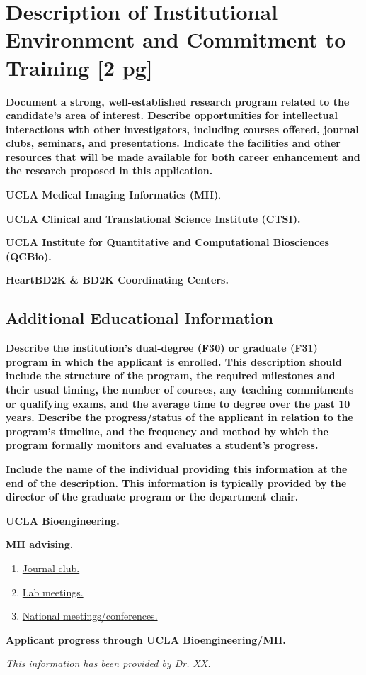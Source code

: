\documentclass[11pt]{article}
\begin{document}
\section*{Description of Institutional Environment and Commitment to Training [2 pg]}

\textbf{Document a strong, well-established research program related to the candidate's area of
interest. Describe opportunities for intellectual interactions with other investigators, including
courses offered, journal clubs, seminars, and presentations. Indicate the facilities and other
resources that will be made available for both career enhancement and the research proposed in
this application.}

\textbf{UCLA Medical Imaging Informatics (MII)}. 
\lipsum[20-22]

\textbf{UCLA Clinical and Translational Science Institute (CTSI).} 
\lipsum[30]

\textbf{UCLA Institute for Quantitative and Computational Biosciences (QCBio).} 
\lipsum[40]

\textbf{HeartBD2K \& BD2K Coordinating Centers.} 
\lipsum[50]

\subsection*{Additional Educational Information}

\textbf{Describe the institution’s dual-degree (F30) or graduate (F31) program in which the
applicant is enrolled. This description should include the structure of the program, the
required milestones and their usual timing, the number of courses, any teaching
commitments or qualifying exams, and the average time to degree over the past 10 years.
Describe the progress/status of the applicant in relation to the program’s timeline, and the frequency and method by which the program formally monitors and evaluates a student’s
progress.}

\textbf{Include the name of the individual providing this information at the end of the description. This information is typically provided by the director of the graduate program or the
department chair.}

\textbf{UCLA Bioengineering.} 
\lipsum[51-53]

\textbf{MII advising.} 
\lipsum[60-61]

\begin{enumerate}[leftmargin=1.75em]
	\item \underline{Journal club.} \lipsum[21]
	\item \underline{Lab meetings.} \lipsum[22]
	\item \underline{National meetings/conferences.} \lipsum[23]
\end{enumerate}

\textbf{Applicant progress through UCLA Bioengineering/MII.} 
\lipsum[24]

\textit{This information has been provided by Dr. XX.}
\end{document}

